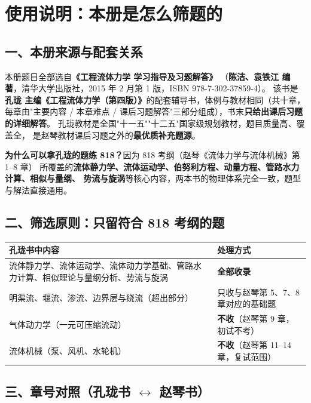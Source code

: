 \chapter*{使用说明：本册是怎么筛题的}

\section*{一、本册来源与配套关系}

本册题目全部选自\textbf{《工程流体力学 学习指导及习题解答》}
（\textbf{陈洁、袁铁江 编著}，清华大学出版社，2015 年 2 月第 1 版，ISBN 978-7-302-37859-4）。
该书是\textbf{孔珑 主编《工程流体力学（第四版）》}的配套辅导书，体例与教材相同（共十章，
每章由"主要内容 / 本章难点 / 课后习题解答"三部分组成），书末\textbf{只给出课后习题的详细解答}。
孔珑教材是全国"十一五""十二五"国家级规划教材，题目质量高、覆盖全，
是赵琴教材课后习题之外的\textbf{最优质补充题源}。

\noindent\textbf{为什么可以拿孔珑的题练 818？}因为 818 考纲（赵琴《流体力学与流体机械》第 1--8 章）
所覆盖的\textbf{流体静力学、流体运动学、伯努利方程、动量方程、管路水力计算、相似与量纲、
势流与旋涡}等核心内容，两本书的物理体系完全一致，题型与解法直接通用。

\section*{二、筛选原则：只留符合 818 考纲的题}

\begin{center}
\begin{tabularx}{\textwidth}{@{}lX@{}}
\toprule
孔珑书中内容 & 处理方式 \\
\midrule
流体静力学、流体运动学、流体动力学基础、管路水力计算、相似理论与量纲分析、势流与旋涡 & \textbf{全部收录} \\
明渠流、堰流、渗流、边界层与绕流（超出部分） & 只收与赵琴第 5、7、8 章对应的基础题 \\
气体动力学（一元可压缩流动） & \textbf{不收}（赵琴第 9 章，初试不考） \\
流体机械（泵、风机、水轮机） & \textbf{不收}（赵琴第 11--14 章，复试范围） \\
\bottomrule
\end{tabularx}
\end{center}

\section*{三、章号对照（孔珑书 $\leftrightarrow$ 赵琴书）}

